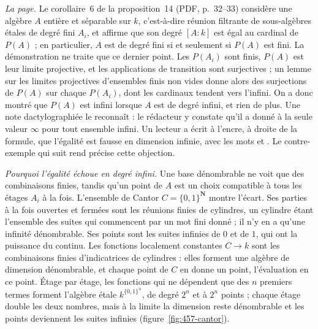 \emph{La page.} Le corollaire~6 de la proposition~14 (PDF, p.~32--33) considère une algèbre $A$ entière et séparable sur $k$, c'est-à-dire réunion filtrante de sous-algèbres étales de degré fini $A_i$, et affirme que son degré $[A:k]$ est égal au cardinal de $P(A)$ ; en particulier, $A$ est de degré fini si et seulement si $P(A)$ est fini. La démonstration ne traite que ce dernier point. Les $P(A_i)$ sont finis, $P(A)$ est leur limite projective, et les applications de transition sont surjectives ; un lemme sur les limites projectives d'ensembles finis non vides donne alors des surjections de $P(A)$ sur chaque $P(A_i)$, dont les cardinaux tendent vers l'infini. On a donc montré que $P(A)$ est infini lorsque $A$ est de degré infini, et rien de plus. Une note dactylographiée le reconnaît : le rédacteur y constate qu'il a donné à  la seule valeur $\infty$ pour tout ensemble infini. Un lecteur a écrit à l'encre, à droite de la formule, que l'égalité est fausse en dimension infinie, avec les mots  et . Le contre-exemple qui suit rend précise cette objection.

\emph{Pourquoi l'égalité échoue en degré infini.} Une base dénombrable ne voit que des combinaisons finies, tandis qu'un point de $A$ est un choix compatible à tous les étages $A_i$ à la fois. L'ensemble de Cantor $C = \{0, 1\}^{\mathbf N}$ montre l'écart. Ses parties à la fois ouvertes et fermées sont les réunions finies de cylindres, un cylindre étant l'ensemble des suites qui commencent par un mot fini donné ; il n'y en a qu'une infinité dénombrable. Ses points sont les suites infinies de $0$ et de $1$, qui ont la puissance du continu. Les fonctions localement constantes $C \to k$ sont les combinaisons finies d'indicatrices de cylindres : elles forment une algèbre de dimension dénombrable, et chaque point de $C$ en donne un point, l'évaluation en ce point. Étage par étage, les fonctions qui ne dépendent que des $n$ premiers termes forment l'algèbre étale $k^{\{0,1\}^n}$, de degré $2^n$ et à $2^n$ points ; chaque étage double les deux nombres, mais à la limite la dimension reste dénombrable et les points deviennent les suites infinies (figure~\ref{fig:457-cantor}).

